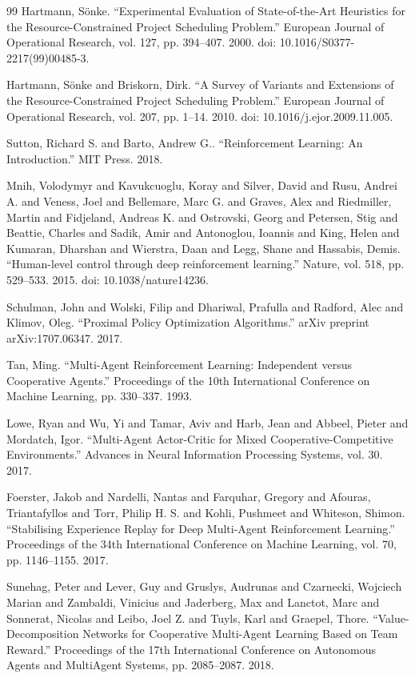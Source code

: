 \documentclass[fleqn,10pt]{wlpeerj}
\begin{document}
\begin{thebibliography}{99}
 Hartmann, S\"onke. ``Experimental Evaluation of State-of-the-Art Heuristics for the Resource-Constrained Project Scheduling Problem.'' European Journal of Operational Research, vol. 127, pp. 394--407. 2000. doi: 10.1016/S0377-2217(99)00485-3.

 Hartmann, S\"onke and Briskorn, Dirk. ``A Survey of Variants and Extensions of the Resource-Constrained Project Scheduling Problem.'' European Journal of Operational Research, vol. 207, pp. 1--14. 2010. doi: 10.1016/j.ejor.2009.11.005.

 Sutton, Richard S. and Barto, Andrew G.. ``Reinforcement Learning: An Introduction.'' MIT Press. 2018.

 Mnih, Volodymyr and Kavukcuoglu, Koray and Silver, David and Rusu, Andrei A. and Veness, Joel and Bellemare, Marc G. and Graves, Alex and Riedmiller, Martin and Fidjeland, Andreas K. and Ostrovski, Georg and Petersen, Stig and Beattie, Charles and Sadik, Amir and Antonoglou, Ioannis and King, Helen and Kumaran, Dharshan and Wierstra, Daan and Legg, Shane and Hassabis, Demis. ``Human-level control through deep reinforcement learning.'' Nature, vol. 518, pp. 529--533. 2015. doi: 10.1038/nature14236.

 Schulman, John and Wolski, Filip and Dhariwal, Prafulla and Radford, Alec and Klimov, Oleg. ``Proximal Policy Optimization Algorithms.'' arXiv preprint arXiv:1707.06347. 2017.

 Tan, Ming. ``Multi-Agent Reinforcement Learning: Independent versus Cooperative Agents.'' Proceedings of the 10th International Conference on Machine Learning, pp. 330--337. 1993.

 Lowe, Ryan and Wu, Yi and Tamar, Aviv and Harb, Jean and Abbeel, Pieter and Mordatch, Igor. ``Multi-Agent Actor-Critic for Mixed Cooperative-Competitive Environments.'' Advances in Neural Information Processing Systems, vol. 30. 2017.

 Foerster, Jakob and Nardelli, Nantas and Farquhar, Gregory and Afouras, Triantafyllos and Torr, Philip H. S. and Kohli, Pushmeet and Whiteson, Shimon. ``Stabilising Experience Replay for Deep Multi-Agent Reinforcement Learning.'' Proceedings of the 34th International Conference on Machine Learning, vol. 70, pp. 1146--1155. 2017.

 Sunehag, Peter and Lever, Guy and Gruslys, Audrunas and Czarnecki, Wojciech Marian and Zambaldi, Vinicius and Jaderberg, Max and Lanctot, Marc and Sonnerat, Nicolas and Leibo, Joel Z. and Tuyls, Karl and Graepel, Thore. ``Value-Decomposition Networks for Cooperative Multi-Agent Learning Based on Team Reward.'' Proceedings of the 17th International Conference on Autonomous Agents and MultiAgent Systems, pp. 2085--2087. 2018.


\end{thebibliography}
\end{document}
